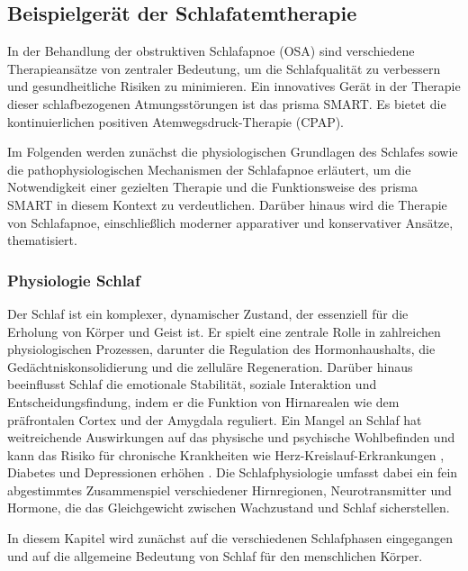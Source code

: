 \documentclass[a4paper, 12pt]{article}
\begin{document}
\newpage
\subsection{Beispielgerät der Schlafatemtherapie}\label{prismaSmart}
In der Behandlung der obstruktiven Schlafapnoe (OSA) sind verschiedene Therapieansätze von zentraler Bedeutung, um die Schlafqualität zu verbessern und gesundheitliche Risiken zu minimieren. Ein innovatives Gerät in der Therapie dieser schlafbezogenen Atmungsstörungen ist das prisma SMART. Es bietet die kontinuierlichen positiven Atemwegsdruck-Therapie (CPAP). 

Im Folgenden werden zunächst die physiologischen Grundlagen des Schlafes sowie die pathophysiologischen Mechanismen der Schlafapnoe erläutert, um die Notwendigkeit einer gezielten Therapie und die Funktionsweise des prisma SMART in diesem Kontext zu verdeutlichen. Darüber hinaus wird die Therapie von Schlafapnoe, einschließlich moderner apparativer und konservativer Ansätze, thematisiert.

\subsubsection{Physiologie Schlaf}
Der Schlaf ist ein komplexer, dynamischer Zustand, der essenziell für die Erholung von Körper und Geist ist. Er spielt eine zentrale Rolle in zahlreichen physiologischen Prozessen, darunter die Regulation des Hormonhaushalts, die Gedächtniskonsolidierung und die zelluläre Regeneration. Darüber hinaus beeinflusst Schlaf die emotionale Stabilität, soziale Interaktion und Entscheidungsfindung, indem er die Funktion von Hirnarealen wie dem präfrontalen Cortex und der Amygdala reguliert. Ein Mangel an Schlaf hat weitreichende Auswirkungen auf das physische und psychische Wohlbefinden und kann das Risiko für chronische Krankheiten wie Herz-Kreislauf-Erkrankungen \cite{cardio_morb_osa}, Diabetes \cite{schlaf_stoffwechsel} und Depressionen \cite{osa_depression} erhöhen \cite{schlaf_krizan}. Die Schlafphysiologie umfasst dabei ein fein abgestimmtes Zusammenspiel verschiedener Hirnregionen, Neurotransmitter und Hormone, die das Gleichgewicht zwischen Wachzustand und Schlaf sicherstellen.

In diesem Kapitel wird zunächst auf die verschiedenen Schlafphasen eingegangen und auf die allgemeine Bedeutung von Schlaf für den menschlichen Körper.
\end{document}
